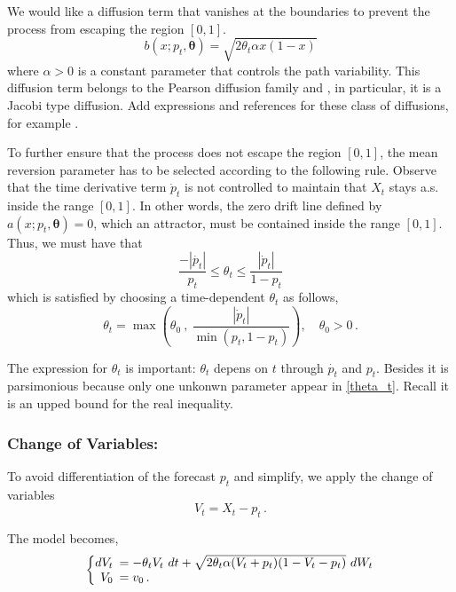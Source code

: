 \documentclass[11pt]{article}
\begin{document}
We would like  a diffusion term that vanishes at the boundaries to prevent the process from escaping the region $[0,1]$.
  \begin{equation}
    b (x; p_t,\bm{\theta} )= \sqrt{2 \theta_t \alpha x (1-x)}
  \end{equation}
  where $\alpha >0$ is a constant parameter that controls the path variability. This diffusion term belongs to the Pearson diffusion family and , in particular, it is a Jacobi type diffusion. {\color{red} Add expressions and references for these class of diffusions, for example \cite{iacus1}.}

To further ensure that the process does not escape the region $[0,1]$, the mean reversion parameter has to be selected according to the following rule. Observe that the time derivative term $\dot{p}_t $ is not controlled to maintain that $X_t$ stays a.s.  inside the range $[0,1]$. In other words, the zero drift line defined by $a(x; p_t,\bm{\theta}) =0$, which an attractor, must be contained inside the range $[0,1]$. Thus, we must have that
\begin{equation}
\frac{- |\dot{p_t}|}{p_t} \leq \theta_t \leq \frac{|\dot{p}_t|}{1- p_t}
\end{equation}
which is satisfied  by choosing a time-dependent  $\theta_t$ as follows,
\begin{equation}
\theta_t = \max \left( \theta_0 \ , \ \frac{|\dot{p}_t|}{\min (p_t, 1-p_t)}  \right ),  \quad \theta_0 >0\,. \label{theta_t}
\end{equation}

{\color{red} The expression for $\theta_t$ is important: $\theta_t$ depens on $t$ through $\dot{p_t}$ and $p_t$. Besides it is parsimonious because only one unkonwn parameter appear in \ref{theta_t}. Recall it is an upped bound for the real inequality. } 

\subsubsection*{Change of Variables:}
To avoid differentiation of the forecast $p_t$ and simplify, we apply the change of variables $$V_t = X_t - p_t \,.$$ 

The  model becomes,
\begin{equation}
  \left\{
  \begin{array}{@{}rl@{}}
    dV_t \!\!\!&=  - \theta_t V_t \  dt + \sqrt{2 \theta_t \alpha (V_t +p_t ) (1-V_t-p_t)} \  dW_t   \\ %
V_0 \!\!\!&=  v_0 \,. \label{VtSDE}
\end{array}\right. 
\end{equation}
\end{document}
